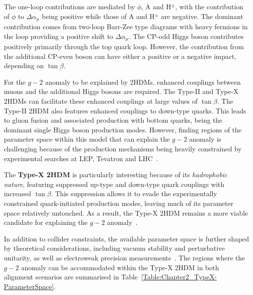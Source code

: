 The one-loop contributions are mediated by $\phi$, A and H$^{\pm}$, with the contribution of $\phi$ to $\Delta\alpha_\mu$ being positive while those of A and H$^{\pm}$ are negative. The dominant contribution comes from two-loop Barr-Zee type diagrams with heavy fermions in the loop providing a positive shift to $\Delta\alpha_\mu$. The CP-odd Higgs boson contributes positively primarily through the top quark loop. However, the contribution from the additional CP-even boson can have either a positive or a negative impact, depending on $\tan{\beta}$. 

For the $g-2$ anomaly to be explained by 2HDMs, enhanced couplings between muons and the additional Higgs bosons are required. The Type-II and Type-X 2HDMs can facilitate these enhanced couplings at large values of $\tan{\beta}$. The Type-II 2HDM also features enhanced couplings to down-type quarks. This leads to gluon fusion and associated production with bottom quarks, being the dominant single Higgs boson production modes. However, finding regions of the parameter space within this model that can explain the $g-2$ anomaly is challenging because of the production mechanisms being heavily constrained by experimental searches at LEP, Tevatron and LHC~\cite{TypeX_2HDM}.

The \textbf{Type-X 2HDM} is particularly interesting because of its \textit{hadrophobic nature}, featuring suppressed up-type and down-type quark couplings with increased $\tan{\beta}$. This suppression allows it to evade the experimentally constrained quark-initiated production modes, leaving much of its parameter space relatively untouched. As a result, the Type-X 2HDM remains a more viable candidate for explaining the $g-2$ anomaly~\cite{TypeX_2HDM}. 

In addition to collider constraints, the available parameter space is further shaped by theoretical considerations, including vacuum stability and perturbative unitarity, as well as electroweak precision measurements~\cite{TypeX_2HDM}. The regions where the $g-2$ anomaly can be accommodated within the Type-X 2HDM in both alignment scenarios are summarised in Table~\ref{Table:Chapter2_TypeX-ParameterSpace}.

